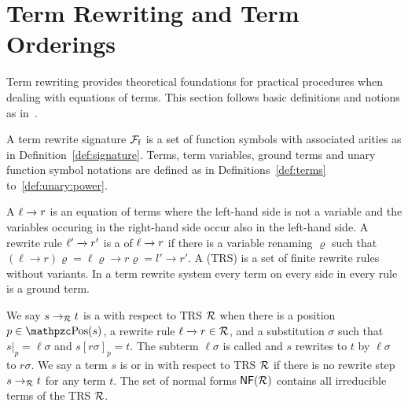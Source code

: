 
\section{Term Rewriting and Term Orderings}\label{sec:termrewriting}

Term rewriting provides theoretical foundations for practical procedures
when dealing with equations of terms.
This section follows basic definitions and notions as in~\cite{AM2015L}.

\begin{definition}\label{def:rewrite:signature}
	A term rewrite signature \( {\mathcal{F}_{\mathsf{f}}} \) is a set of function symbols
	with associated arities
	as in Definition~\ref{def:signature}.
	Terms, term variables, ground terms and unary function symbol notations
	are defined as in Definitions~\ref{def:terms} to~\ref{def:unary:power}.
\end{definition}


\begin{definition}\label{def:rewriterule}
	A  \( \ell\xrightarrow[{}]{} r \) is an equation of terms where the left-hand side is not a variable
	and the variables occuring in the right-hand side occur also in the left-hand side.
	A rewrite rule \( \ell'\xrightarrow[{}]{} r' \) is a  of \( \ell\xrightarrow[{}]{} r \) if there is a variable renaming \( \varrho \)
	such that
	\( (\ell\rightarrow r)\varrho = \ell\varrho\rightarrow r\varrho = l'\rightarrow r' \).
	A  (TRS) is a set of finite rewrite rules without variants.
	In a  term rewrite system every term on every side in every rule is a ground term.
\end{definition}

%
\begin{definition}
	We say \( s\rightarrow_{\mathcal{R}} t \) is a
	 with respect to TRS \( \mathcal{R} \)
	when there is a position \( p \in \pos(s) \),
	a rewrite rule \( \ell\xrightarrow[{}]{} r\in\mathcal{R} \),
	and a substitution \( \sigma \) such that
	\( s|_p=\ell\sigma \) and \( s{[r\sigma]}_p = t \).
		The subterm \( \ell\sigma \) is called  and
	\( s \) rewrites to \( t \) by  \( \ell\sigma \) to  \( r\sigma \).
	We say a term \( s \) is  or in  with respect to TRS \( \mathcal{R} \) if there is no rewrite step \( s\rightarrow_{\mathcal{R}} t \) for any term \( t \).
	The set of normal forms \( \mathsf{NF} (\mathcal{R}) \) contains all irreducible terms of the TRS \( \mathcal{R} \).

	\end{definition}

